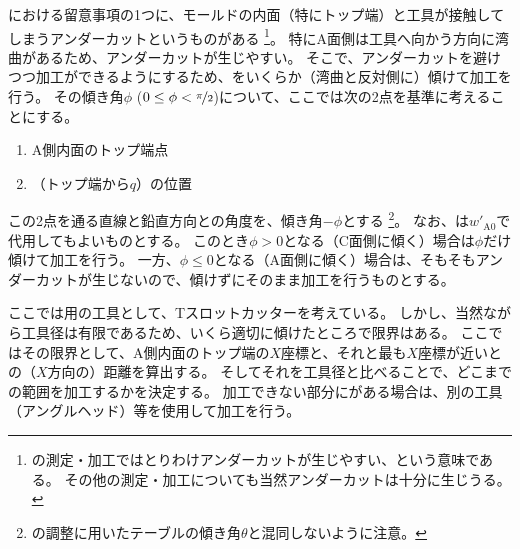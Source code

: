 \clearpage
\DimpleMilling における留意事項の1つに、モールドの内面（特にトップ端）と工具が接触してしまうアンダーカットというものがある
\footnote{\Dimple の測定・加工ではとりわけアンダーカットが生じやすい、という意味である。
その他の測定・加工についても当然アンダーカットは十分に生じうる。}。
特にA面側は工具へ向かう方向に湾曲があるため、アンダーカットが生じやすい。
そこで、アンダーカットを避けつつ加工ができるようにするため、をいくらか（湾曲と反対側に）傾けて加工を行う。
その傾き角$\phi$ ($0 \leq \phi < \nicefrac\pi2$)について、ここでは次の2点を基準に考えることにする。
\begin{tcolorbox}[title=A面の\Dimple, fonttitle=\gtfamily\bfseries]
\begin{enumerate}[label=\sarrow]
\item A側内面のトップ端点
\item \AFaceDimpleFirstRow（トップ端から$q$）の位置
\end{enumerate}
\end{tcolorbox}\noindent
この2点を通る直線と鉛直方向との角度を、傾き角$-\phi$とする
\footnote{\AlocationLength の調整に用いたテーブルの傾き角$\theta$と混同しないように注意。}。
なお、\TopEndACID は$w'_{\mathrm A0}$で代用してもよいものとする。
このとき$\phi > 0$となる（C面側に傾く）場合は$\phi$だけ傾けて加工を行う。
一方、$\phi \leq 0$となる（A面側に傾く）場合は、そもそもアンダーカットが生じないので、傾けずにそのまま加工を行うものとする。
\begin{hosoku}
ここでは\DimpleMilling 用の工具として、Tスロットカッターを考えている。
しかし、当然ながら工具径は有限であるため、いくら適切に傾けたところで限界はある。
ここではその限界として、A側内面のトップ端の$X$座標と、それと最も$X$座標が近い\Dimple との（$X$方向の）距離を算出する。
そしてそれを工具径と比べることで、どこまでの範囲を加工するかを決定する。
加工できない部分に\Dimple がある場合は、別の工具（アングルヘッド）等を使用して加工を行う。
\end{hosoku}
